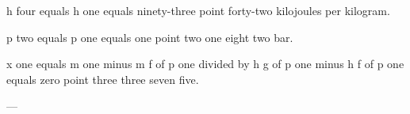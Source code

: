h four equals h one equals ninety-three point forty-two kilojoules per kilogram.  

p two equals p one equals one point two one eight two bar.  

x one equals m one minus m f of p one divided by h g of p one minus h f of p one equals zero point three three seven five.  

---